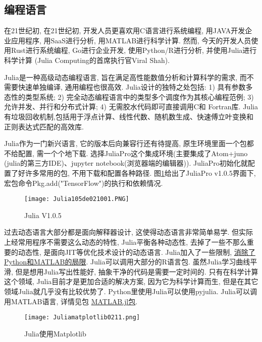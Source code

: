 \subsection{编程语言}
在21世纪初, 在21世纪初, 开发人员更喜欢用C语言进行系统编程, 用JAVA开发企业应用程序, 用SaaS进行分析, 用MATLAB进行科学计算.
然而, 今天的开发人员使用Rust进行系统编程, Go进行企业开发, 使用Python/R进行分析, 并使用Julia进行科学计算 (Julia Computing的首席执行官Viral Shah).
\begin{remark}
  Julia是一种高级动态编程语言, 旨在满足高性能数值分析和计算科学的需求, 而不需要快速单独编译, 通用编程也很高效.
  Julia设计的独特之处包括: 1) 具有参数多态性的类型系统; 2) 完全动态编程语言中的类型多个调度作为其核心编程范例; 3) 允许并发、并行和分布式计算; 4) 无需胶水代码即可直接调用C和 Fortran库.
  Julia有垃圾回收机制,包括用于浮点计算、线性代数、随机数生成、快速傅立叶变换和正则表达式匹配的高效库.

  Julia作为一门新兴语言, 它的版本后向兼容行还有待提高, 原生环境里面一个包都不给配置, 需一个个地下载. 选择JuliaPro这个集成环境(主要集成了Atom+juno (julia的第三方IDE)、jupyter notebook(浏览器端的编辑器)).
  JuliaPro初始化就配置了好许多常用的包, 不用下载和配置各种路径. 图\ref{Julia105de021001}给出了JuliaPro v1.0.5界面下, 宏包命令Pkg.add("TensorFlow")的执行和依赖情况.
\end{remark}
\begin{figure}[H]
\centering
\texttt{[image: Julia105de021001.PNG]}
\caption{Julia V1.0.5}
\label{Julia105de021001}
\end{figure}
\begin{remark}
 过去动态语言大部分都是面向解释器设计, 这使得动态语言非常简单易学. 但实际上经常用程序不需要这么动态的特性, Julia平衡各种动态性, 去掉了一些不那么重要的动态性, 是面向JIT等优化技术设计的动态语言. Julia加入了一些限制, \href{https://www.zhihu.com/question/284356534/answer/437372256}{消除了Python和MATLAB的局限}.
 Julia可以调用大部分的R语言包. 虽然Julia学习曲线平滑, 但是想用Julia写出性能好, 抽象干净的代码是需要一定时间的.
 只有在科学计算这个领域, Julia目前才是更加合适的解决方案, 因为它为科学计算而生, 但是在其它领域Julia就几乎没有比较优势了.
 Python里使用Julia可以使用pyjulia.
 Julia可以调用MATLAB语言, 详情见包 \href{https://github.com/JuliaInterop/MATLAB.jl}{MATLAB.jl包}.
\end{remark}
\begin{figure}[H]
\centering
\texttt{[image: Juliamatplotlib0211.png]}
\caption{Julia使用Matplotlib}
\label{Juliamatplotlib0211}
\end{figure}
